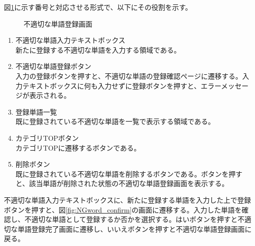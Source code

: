 \documentclass[a4j]{jarticle}
\begin{document}
図\ref{fig:NGword}に示す番号と対応させる形式で、以下にその役割を示す。
\begin{figure}[H]
\centering
{}
\caption{不適切な単語登録画面}
\label{fig:NGword}
\end{figure}
\begin{enumerate}
  \renewcommand{\labelenumi}{\textcircled{\scriptsize \theenumi}}
  \item 不適切な単語入力テキストボックス\\
  新たに登録する不適切な単語を入力する領域である。
  \item 不適切な単語登録ボタン\\
  入力の登録ボタンを押すと、不適切な単語の登録確認ページに遷移する。入力テキストボックスに何も入力せずに登録ボタンを押すと、エラーメッセージが表示される。
  \item 登録単語一覧\\
  既に登録されている不適切な単語を一覧で表示する領域である。
  \item カテゴリTOPボタン\\
  カテゴリTOPに遷移するボタンである。
  \item 削除ボタン\\
  既に登録されている不適切な単語を削除するボタンである。ボタンを押すと、該当単語が削除された状態の不適切な単語登録画面を表示する。
\end{enumerate}
不適切な単語入力テキストボックスに、新たに登録する単語を入力した上で登録ボタンを押すと、図\ref{fig:NGword_confirm}の画面に遷移する。入力した単語を確認し、不適切な単語として登録するか否かを選択する。はいボタンを押すと不適切な単語登録完了画面に遷移し、いいえボタンを押すと不適切な単語登録画面に戻る。
\end{document}

